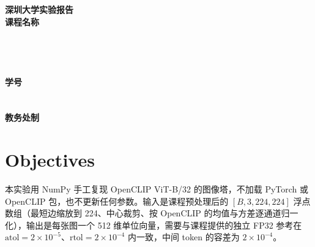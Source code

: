 \documentclass[a4paper,12pt]{article}
\begin{document}
\begin{titlepage}
    \centering
    \vspace*{1.6cm}
    \Huge{\textbf{深圳大学实验报告}}\\[1.4cm]

    {\Large\textbf{课程名称}\quad\underline{}}\\[0.5cm]
{\Large
\noindent{}
\underline{}}\\[0.5cm]
{\Large
\noindent{}
\underline{}}\\[0.5cm]
{\Large
\noindent{}
\underline{}}\\[0.5cm]
{\Large
\noindent{}
\underline{}}\\[0.5cm]
{\Large
\noindent{}
\underline{}
\hspace{0.5cm}
\textbf{学号}
\underline{}}\\[0.5cm]
{\Large
\noindent{}
\underline{}}\\[0.5cm]
{\Large
\noindent{}
\underline{}}\\[1.2cm]

    \vfill
    \Large{\textbf{教务处制}}
\end{titlepage}

\newpage


\section{Objectives}

本实验用 NumPy 手工复现 OpenCLIP ViT-B/32 的图像塔，不加载 PyTorch 或 OpenCLIP 包，也不更新任何参数。输入是课程预处理后的 $[B,3,224,224]$ 浮点数组（最短边缩放到 224、中心裁剪、按 OpenCLIP 的均值与方差逐通道归一化），输出是每张图一个 512 维单位向量，需要与课程提供的独立 FP32 参考在 $\mathrm{atol}=2\times10^{-5}$、$\mathrm{rtol}=2\times10^{-4}$ 内一致，中间 token 的容差为 $2\times10^{-4}$。
\end{document}
